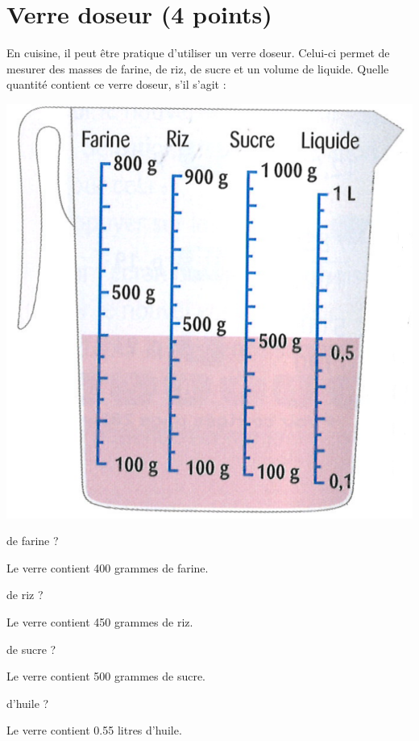 \section{Verre doseur (4 points)}


En cuisine, il peut être pratique d'utiliser un verre doseur. Celui-ci permet de mesurer des masses de farine, de riz, de sucre et un volume de liquide.
Quelle quantité contient ce verre doseur, s'il s'agit :

\begin{center}
	\includegraphics[scale=0.45]{img/verre}
\end{center}
\begin{questions}
	
	\begin{multicols}{2}
		
	\question[1] 
	
	de farine ? 
	\begin{solution}
		Le verre contient 400 grammes de farine.
	\end{solution}
	
	
	\question[1]
	
	de riz ?
	\begin{solution}
		Le verre contient 450 grammes de riz.
	\end{solution}
	
	\question[1]
	
	de sucre ? 
	\begin{solution}
		Le verre contient 500 grammes de sucre.
	\end{solution}
	
	\question[1]
	
	d'huile ?
	\begin{solution}
		Le verre contient \num{0.55} litres d'huile.
	\end{solution}
	\end{multicols}
	
\end{questions}